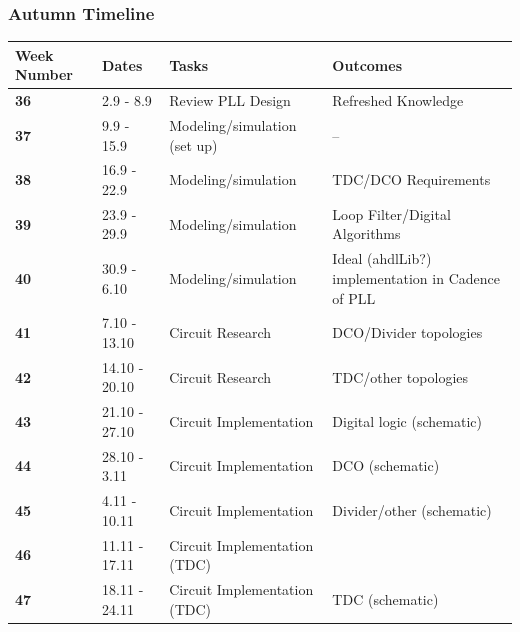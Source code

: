 \documentclass[t, screen, aspectratio=43]{beamer}
\begin{document}
\begin{frame}
	\frametitle{Autumn Timeline}
	\begin{table}[htb!]
		\tiny
		\centering
		\def\arraystretch{1.5}		
		\setlength\arrayrulewidth{0.75pt}
		\setlength{\tabcolsep}{1em} %
		\begin{tabular}{|l|l|l|l|}
			\hline 
			\rule[-1ex]{0pt}{2.5ex} \cellcolor{gray!40}\textbf{Week Number} & \cellcolor{gray!40}\textbf{Dates} &\cellcolor{gray!40}\textbf{Tasks} & \cellcolor{gray!40}\textbf{Outcomes}\\ 
			\hline 
			\rule[-1ex]{0pt}{2.5ex} \cellcolor{red!20}\textbf{36}& \cellcolor{red!20}2.9 - 8.9 & \cellcolor{red!20}Review PLL Design & \cellcolor{red!20}Refreshed Knowledge\\ 
			\hline 
			\rule[-1ex]{0pt}{2.5ex} \textbf{37}& 9.9 - 15.9 & Modeling/simulation (set up) & --\\ 
			\hline 
			\rule[-1ex]{0pt}{2.5ex} \textbf{38}& 16.9 - 22.9 & Modeling/simulation & TDC/DCO Requirements\\ 
			\hline 
			\rule[-1ex]{0pt}{2.5ex} \textbf{39}& 23.9 - 29.9& Modeling/simulation& Loop Filter/Digital Algorithms\\ 
			\hline 
			\rule[-1ex]{0pt}{2.5ex} \textbf{40}& 30.9 - 6.10& Modeling/simulation& Ideal (ahdlLib?) implementation in Cadence of PLL\\ 
			\hline 
			\rule[-1ex]{0pt}{2.5ex} \textbf{41}& 7.10 - 13.10& Circuit Research & DCO/Divider topologies\\ 
			\hline 
			\rule[-1ex]{0pt}{2.5ex} \textbf{42}& 14.10 - 20.10& Circuit Research & TDC/other topologies\\ 
			\hline 
			\rule[-1ex]{0pt}{2.5ex} \textbf{43}& 21.10 - 27.10& Circuit Implementation& Digital logic (schematic)\\ 
			\hline 
			\rule[-1ex]{0pt}{2.5ex} \textbf{44}& 28.10 - 3.11& Circuit Implementation& DCO (schematic)\\ 
			\hline 
			\rule[-1ex]{0pt}{2.5ex} \textbf{45}& 4.11 - 10.11& Circuit Implementation& Divider/other (schematic)\\ 
			\hline 
			\rule[-1ex]{0pt}{2.5ex} \textbf{46}& 11.11 - 17.11& Circuit Implementation (TDC)& \\ 
			\hline 
			\rule[-1ex]{0pt}{2.5ex} \textbf{47}& 18.11 - 24.11& Circuit Implementation (TDC)& TDC (schematic)\\ 

\end{tabular}
\end{table}
\end{frame}
\end{document}
